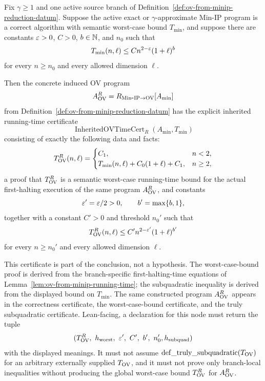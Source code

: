 \begin{lemma}
  \label{lem:ov-from-minip-inherited-subquadratic-certificate}
  Fix $\gamma\geq1$ and one active source branch of
  Definition~\ref{def:ov-from-minip-reduction-datum}.  Suppose the active
  exact or $\gamma$-approximate Min-IP program is a correct algorithm with
  semantic worst-case bound $T_{\min}$, and suppose there are constants
  $\varepsilon>0$, $C>0$, $b\in\mathbb{N}$, and $n_0$ such that
  \[
    T_{\min}(n,\ell)\leq C n^{2-\varepsilon}(1+\ell)^b
  \]
  for every $n\geq n_0$ and every allowed dimension $\ell$.

  Then the concrete induced OV program
  \[
    A_{\mathrm{OV}}^R=R_{\mathrm{Min\mbox{-}IP}\to\mathrm{OV}}[A_{\min}]
  \]
  from Definition~\ref{def:ov-from-minip-reduction-datum} has the explicit
  inherited running-time certificate
  \[
    \operatorname{InheritedOVTimeCert}_R(A_{\min},T_{\min})
  \]
  consisting of exactly the following data and facts:
  \[
    T_{\mathrm{OV}}^R(n,\ell)=
    \begin{cases}
      C_1, & n<2,\\
      T_{\min}(n,\ell)+C_0(1+\ell)+C_1, & n\geq2,
    \end{cases}
  \]
  a proof that $T_{\mathrm{OV}}^R$ is a semantic worst-case running-time bound for the
  actual first-halting execution of the same program $A_{\mathrm{OV}}^R$, and
  constants
  \[
    \varepsilon'=\varepsilon/2>0,\qquad b'=\max\{b,1\},
  \]
  together with a constant $C'>0$ and threshold $n_0'$ such that
  \[
    T_{\mathrm{OV}}^R(n,\ell)\leq C'n^{2-\varepsilon'}(1+\ell)^{b'}
  \]
  for every $n\geq n_0'$ and every allowed dimension $\ell$.

  This certificate is part of the conclusion, not a hypothesis.  The
  worst-case-bound proof is derived from the branch-specific first-halting-time
  equations of Lemma~\ref{lem:ov-from-minip-running-time}; the subquadratic
  inequality is derived from the displayed bound on $T_{\min}$.  The same
  constructed program $A_{\mathrm{OV}}^R$ appears in the correctness certificate, the
  worst-case-bound certificate, and the truly subquadratic certificate.
  Lean-facing, a declaration for this node must return the tuple
  \[
    (T_{\mathrm{OV}}^R,\ h_{\rm worst},\ \varepsilon',\ C',\ b',\ n_0',
      h_{\rm subquad})
  \]
  with the displayed meanings.  It must not assume
  $\operatorname{def\_truly\_subquadratic}(T_{\mathrm{OV}})$ for an arbitrary
  externally supplied $T_{\mathrm{OV}}$, and it must not prove only branch-local
  inequalities without producing the global worst-case bound $T_{\mathrm{OV}}^R$ for
  $A_{\mathrm{OV}}^R$.
\end{lemma}
